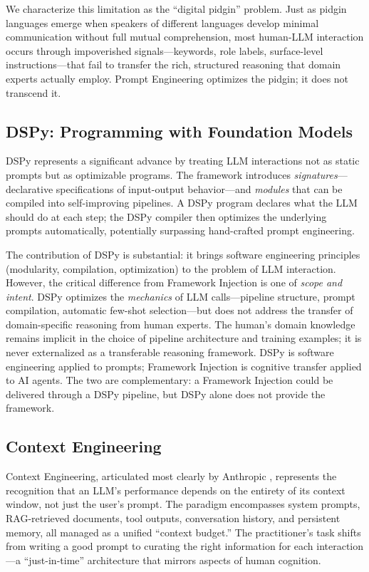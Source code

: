 \documentclass[12pt,a4paper]{article}
\begin{document}
We characterize this limitation as the ``digital pidgin'' problem. Just as pidgin languages emerge when speakers of different languages develop minimal communication without full mutual comprehension, most human-LLM interaction occurs through impoverished signals---keywords, role labels, surface-level instructions---that fail to transfer the rich, structured reasoning that domain experts actually employ. Prompt Engineering optimizes the pidgin; it does not transcend it.

\subsection{DSPy: Programming with Foundation Models}
\label{sec:related:dspy}

DSPy \citep{khattab2023dspy} represents a significant advance by treating LLM interactions not as static prompts but as optimizable programs. The framework introduces \emph{signatures}---declarative specifications of input-output behavior---and \emph{modules} that can be compiled into self-improving pipelines. A DSPy program declares what the LLM should do at each step; the DSPy compiler then optimizes the underlying prompts automatically, potentially surpassing hand-crafted prompt engineering.

The contribution of DSPy is substantial: it brings software engineering principles (modularity, compilation, optimization) to the problem of LLM interaction. However, the critical difference from Framework Injection is one of \emph{scope and intent}. DSPy optimizes the \emph{mechanics} of LLM calls---pipeline structure, prompt compilation, automatic few-shot selection---but does not address the transfer of domain-specific reasoning from human experts. The human's domain knowledge remains implicit in the choice of pipeline architecture and training examples; it is never externalized as a transferable reasoning framework. DSPy is software engineering applied to prompts; Framework Injection is cognitive transfer applied to AI agents. The two are complementary: a Framework Injection could be delivered through a DSPy pipeline, but DSPy alone does not provide the framework.

\subsection{Context Engineering}
\label{sec:related:ce}

Context Engineering, articulated most clearly by Anthropic \citep{anthropic2025context}, represents the recognition that an LLM's performance depends on the entirety of its context window, not just the user's prompt. The paradigm encompasses system prompts, RAG-retrieved documents, tool outputs, conversation history, and persistent memory, all managed as a unified ``context budget.'' The practitioner's task shifts from writing a good prompt to curating the right information for each interaction---a ``just-in-time'' architecture that mirrors aspects of human cognition.
\end{document}
